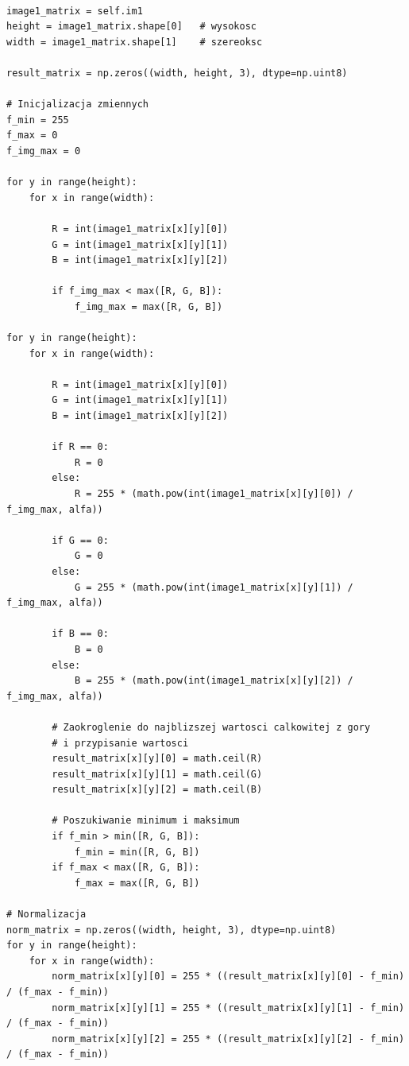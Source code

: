 \documentclass[final,a4paper,openany,12pt]{mwbk}
\begin{document}
\begin{lstlisting}[caption= Potęgowanie obrazu barwowego]

image1_matrix = self.im1
height = image1_matrix.shape[0]   # wysokosc
width = image1_matrix.shape[1]    # szereoksc

result_matrix = np.zeros((width, height, 3), dtype=np.uint8)

# Inicjalizacja zmiennych
f_min = 255
f_max = 0
f_img_max = 0

for y in range(height):
    for x in range(width):  

        R = int(image1_matrix[x][y][0])
        G = int(image1_matrix[x][y][1])
        B = int(image1_matrix[x][y][2])

        if f_img_max < max([R, G, B]):
            f_img_max = max([R, G, B])

for y in range(height):
    for x in range(width):  

        R = int(image1_matrix[x][y][0])
        G = int(image1_matrix[x][y][1])
        B = int(image1_matrix[x][y][2])

        if R == 0:
            R = 0
        else:
            R = 255 * (math.pow(int(image1_matrix[x][y][0]) / f_img_max, alfa))

        if G == 0:
            G = 0
        else:
            G = 255 * (math.pow(int(image1_matrix[x][y][1]) / f_img_max, alfa))
        
        if B == 0:
            B = 0
        else:
            B = 255 * (math.pow(int(image1_matrix[x][y][2]) / f_img_max, alfa))

        # Zaokroglenie do najblizszej wartosci calkowitej z gory
        # i przypisanie wartosci
        result_matrix[x][y][0] = math.ceil(R)
        result_matrix[x][y][1] = math.ceil(G)
        result_matrix[x][y][2] = math.ceil(B)

        # Poszukiwanie minimum i maksimum                
        if f_min > min([R, G, B]):
            f_min = min([R, G, B])
        if f_max < max([R, G, B]):
            f_max = max([R, G, B])

# Normalizacja
norm_matrix = np.zeros((width, height, 3), dtype=np.uint8)
for y in range(height):
    for x in range(width):
        norm_matrix[x][y][0] = 255 * ((result_matrix[x][y][0] - f_min) / (f_max - f_min))
        norm_matrix[x][y][1] = 255 * ((result_matrix[x][y][1] - f_min) / (f_max - f_min))
        norm_matrix[x][y][2] = 255 * ((result_matrix[x][y][2] - f_min) / (f_max - f_min))


\end{lstlisting}
\newpage
\end{document}

